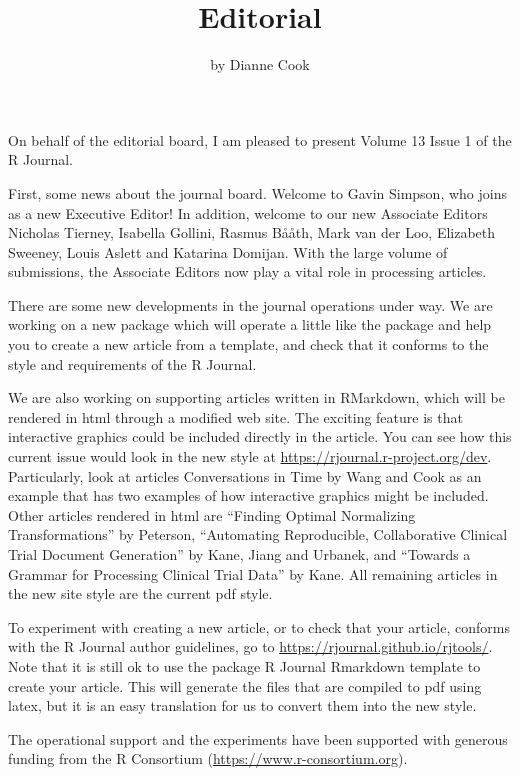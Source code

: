 \title{Editorial}
\author{by Dianne Cook}

\maketitle


On behalf of the editorial board, I am pleased to present Volume 13
Issue 1 of the R Journal.

First, some news about the journal board. Welcome to Gavin Simpson, who
joins as a new Executive Editor! In addition, welcome to our new
Associate Editors Nicholas Tierney, Isabella Gollini, Rasmus
B\r{a}\r{a}th, Mark van der Loo, Elizabeth Sweeney, Louis Aslett and
Katarina Domijan. With the large volume of submissions, the Associate
Editors now play a vital role in processing articles.

There are some new developments in the journal operations under way. We
are working on a new package  which will operate a little
like the  package and help you to create a new article
from a template, and check that it conforms to the style and
requirements of the R Journal.

We are also working on supporting articles written in RMarkdown, which
will be rendered in html through a modified  web site.
The exciting feature is that interactive graphics could be included
directly in the article. You can see how this current issue would look
in the new style at \url{https://rjournal.r-project.org/dev}.
Particularly, look at articles Conversations in Time by Wang and Cook as
an example that has two examples of how interactive graphics might be
included. Other articles rendered in html are ``Finding Optimal
Normalizing Transformations'' by Peterson, ``Automating Reproducible,
Collaborative Clinical Trial Document Generation'' by Kane, Jiang and
Urbanek, and ``Towards a Grammar for Processing Clinical Trial Data'' by
Kane. All remaining articles in the new site style are the current pdf
style.

To experiment with creating a new article, or to check that your
article, conforms with the R Journal author guidelines, go to
\url{https://rjournal.github.io/rjtools/}. Note that it is still ok to
use the  package R Journal Rmarkdown template to create
your article. This will generate the files that are compiled to pdf
using latex, but it is an easy translation for us to convert them into
the new style.

The operational support and the experiments have been supported with
generous funding from the R Consortium
(\url{https://www.r-consortium.org}).

